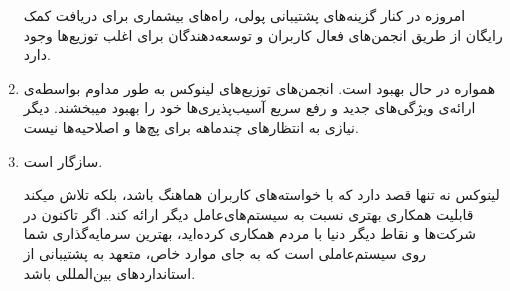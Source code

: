 \begin{enumerate}
امروزه در کنار گزینه‌های پشتیبانی پولی، راه‌های بیشماری برای دریافت کمک رایگان از طریق انجمن‌های فعال کاربران و توسعه‌دهندگان برای اغلب توزیع‌ها وجود دارد.
\item  همواره در حال بهبود است.
انجمن‌های توزیع‌های لینوکس به طور مداوم بواسطه‌ی ارائه‌ی ویژگی‌های جدید و رفع سریع آسیب‌پذیری‌ها خود را بهبود میبخشند. دیگر نیازی به انتظارهای چندماهه برای پچ‌ها و اصلاحیه‌ها نیست.
\item  سازگار است.

لینوکس نه تنها قصد دارد که با خواسته‌های کاربران هماهنگ باشد، بلکه تلاش میکند قابلیت همکاری بهتری نسبت به سیستم‌های‌عامل دیگر ارائه کند. اگر تاکنون در شرکت‌ها و نقاط دیگر دنیا با مردم همکاری کرده‌اید، بهترین سرمایه‌گذاری شما روی سیستم‌عاملی است که به جای موارد خاص، متعهد به پشتیبانی از استانداردهای بین‌المللی باشد.
\end{enumerate}